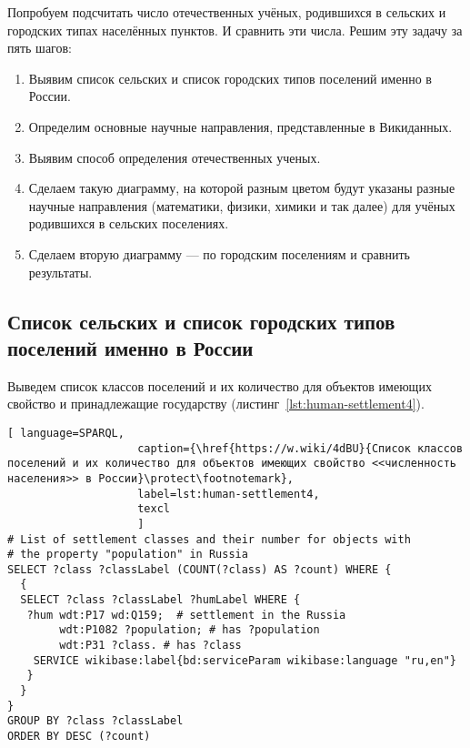 Попробуем подсчитать число отечественных учёных, родившихся в сельских и городских типах населённых пунктов. И сравнить эти числа.
Решим эту задачу за пять шагов:
\begin{enumerate}
  \item Выявим список сельских и список городских типов поселений именно в России.
  \item Определим основные научные направления, представленные в Викиданных.
  \item Выявим способ определения отечественных ученых.
  \item Сделаем такую диаграмму, на которой разным цветом будут указаны разные научные направления (математики, физики, химики и так далее) для учёных родившихся в сельских поселениях.
  \item Сделаем вторую диаграмму — по городским поселениям и сравнить результаты.
\end{enumerate}

\subsection{Список сельских и список городских типов поселений именно в России}

Выведем список классов поселений и их количество для объектов имеющих свойство  и принадлежащие государству  (листинг~\ref{lst:human-settlement4}). 

\begin{lstlisting}[ language=SPARQL, 
                    caption={\href{https://w.wiki/4dBU}{Список классов поселений и их количество для объектов имеющих свойство <<численность населения>> в России}\protect\footnotemark},
                    label=lst:human-settlement4,
                    texcl 
                    ]
# List of settlement classes and their number for objects with 
# the property "population" in Russia
SELECT ?class ?classLabel (COUNT(?class) AS ?count) WHERE {
  {
  SELECT ?class ?classLabel ?humLabel WHERE {
   ?hum wdt:P17 wd:Q159;  # settlement in the Russia
        wdt:P1082 ?population; # has ?population
        wdt:P31 ?class. # has ?class
    SERVICE wikibase:label{bd:serviceParam wikibase:language "ru,en"}
   }
  }
}
GROUP BY ?class ?classLabel
ORDER BY DESC (?count)
\end{lstlisting}%

